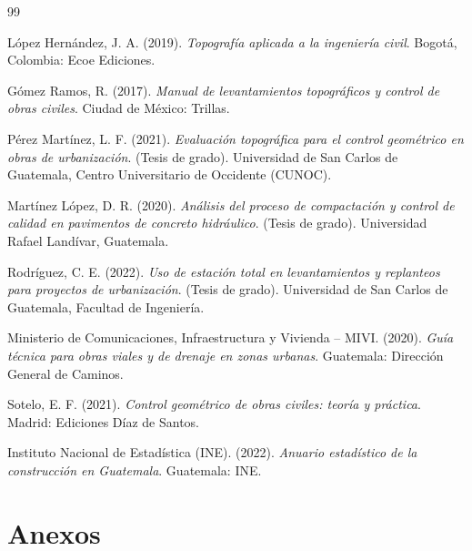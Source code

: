 \documentclass[12pt]{article}
\let\oldsection\section
\renewcommand{\section}{\clearpage\oldsection}
\begin{document}
	
	\begin{thebibliography}{99}
		
		
		
		López Hernández, J. A. (2019). \textit{Topografía aplicada a la ingeniería civil}. Bogotá, Colombia: Ecoe Ediciones.
		
		Gómez Ramos, R. (2017). \textit{Manual de levantamientos topográficos y control de obras civiles}. Ciudad de México: Trillas.
		
		Pérez Martínez, L. F. (2021). \textit{Evaluación topográfica para el control geométrico en obras de urbanización}. (Tesis de grado). Universidad de San Carlos de Guatemala, Centro Universitario de Occidente (CUNOC).
		
		Martínez López, D. R. (2020). \textit{Análisis del proceso de compactación y control de calidad en pavimentos de concreto hidráulico}. (Tesis de grado). Universidad Rafael Landívar, Guatemala.
		
		Rodríguez, C. E. (2022). \textit{Uso de estación total en levantamientos y replanteos para proyectos de urbanización}. (Tesis de grado). Universidad de San Carlos de Guatemala, Facultad de Ingeniería.
		
		Ministerio de Comunicaciones, Infraestructura y Vivienda – MIVI. (2020). \textit{Guía técnica para obras viales y de drenaje en zonas urbanas}. Guatemala: Dirección General de Caminos.
		
		Sotelo, E. F. (2021). \textit{Control geométrico de obras civiles: teoría y práctica}. Madrid: Ediciones Díaz de Santos.
		
		Instituto Nacional de Estadística (INE). (2022). \textit{Anuario estadístico de la construcción en Guatemala}. Guatemala: INE.
		
	\end{thebibliography}
	
	
	\section{Anexos}
	
	
	
	
\end{document}
